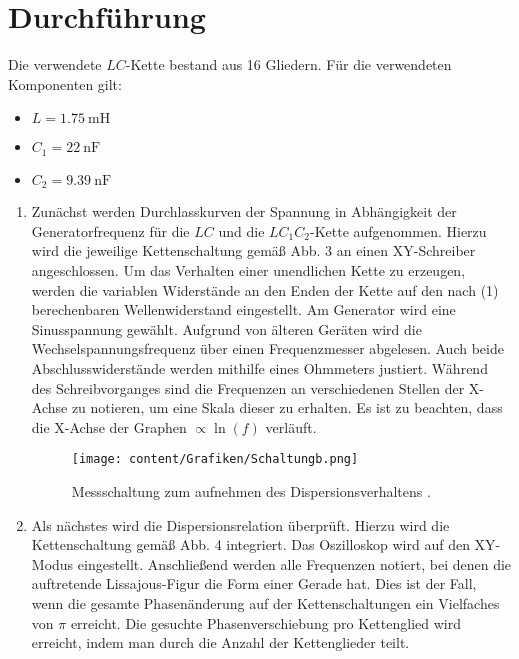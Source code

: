
\section{Durchführung}
\label{sec:Durchführung}
\renewcommand{\labelenumi}{\alph{enumi})}
Die verwendete $LC$-Kette bestand aus 16 Gliedern. Für die verwendeten Komponenten gilt:
\begin{itemize}
\item $L=\SI{1.75}{\milli\henry}$
\item $C_1=\SI{22}{\nano\farad}$
\item $C_2=\SI{9.39}{\nano\farad}$
\end{itemize}
\begin{enumerate}

  \begin{figure}[H]
    \centering
    \texttt{[image: content/Grafiken/Schaltunga.png]}
    \caption{Schaltung zum Aufzeichnen der Durchlasskurven \cite{V356}.}
    \label{fig:Schaltung1}
  \end{figure}

  \item Zunächst werden Durchlasskurven der Spannung in Abhängigkeit der Generatorfrequenz für die $LC$ und die $LC_1C_2$-Kette aufgenommen.
   Hierzu wird die jeweilige Kettenschaltung gemäß Abb. 3 an einen XY-Schreiber
   angeschlossen. Um das Verhalten einer unendlichen Kette zu erzeugen, werden die
   variablen Widerstände an den Enden der Kette auf den nach (1) berechenbaren
   Wellenwiderstand eingestellt. Am Generator wird eine Sinusspannung gewählt.
    Aufgrund von älteren Geräten wird die Wechselspannungsfrequenz über einen
     Frequenzmesser abgelesen. Auch beide Abschlusswiderstände werden mithilfe
      eines Ohmmeters justiert. Während des Schreibvorganges sind die Frequenzen
       an verschiedenen Stellen der X-Achse zu notieren, um eine Skala dieser zu erhalten.
        Es ist zu beachten, dass die X-Achse der
       Graphen $\propto \ln(f)$ verläuft.

       \begin{figure}[H]
         \centering
         \texttt{[image: content/Grafiken/Schaltungb.png]}
         \caption{Messschaltung zum aufnehmen des Dispersionsverhaltens \cite{V356}.}
         \label{fig:Schaltung2}
       \end{figure}

\item Als nächstes wird die Dispersionsrelation überprüft. Hierzu wird die
 Kettenschaltung gemäß Abb. 4 integriert. Das Oszilloskop
  wird auf den XY-Modus eingestellt. Anschließend werden alle Frequenzen notiert,
    bei denen die auftretende Lissajous-Figur die Form einer Gerade hat. Dies ist der
     Fall, wenn die gesamte Phasenänderung auf der Kettenschaltungen ein
      Vielfaches von $\pi$ erreicht. Die gesuchte Phasenverschiebung pro Kettenglied
       wird erreicht, indem man durch die Anzahl der Kettenglieder teilt.


\end{enumerate}
